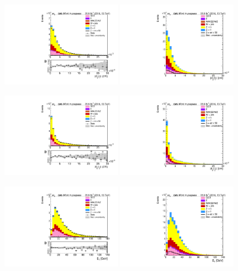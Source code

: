 \begin{figure}[htp]
	\includegraphics[width=0.45\textwidth]{plots/et/ImpactParameter1_CR.pdf}
	\includegraphics[width=0.45\textwidth]{plots/et/ImpactParameter1_withsignal.pdf}

	\includegraphics[width=0.45\textwidth]{plots/et/ImpactParameter2_CR.pdf}
	\includegraphics[width=0.45\textwidth]{plots/et/ImpactParameter2_withsignal.pdf}

	\includegraphics[width=0.45\textwidth]{plots/et/MissingTranverseEnergy_CR.pdf}
	\includegraphics[width=0.45\textwidth]{plots/et/MissingTranverseEnergy_withsignal.pdf}
\end{figure}

